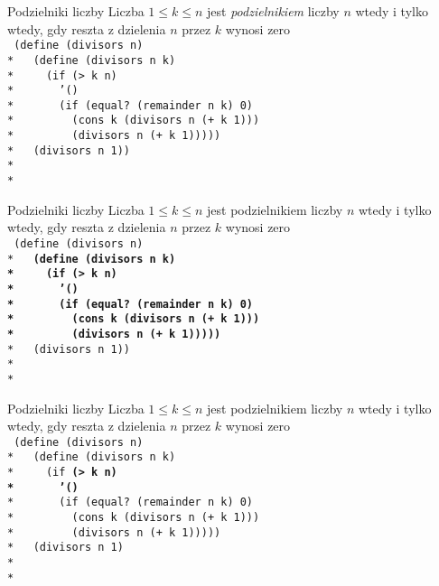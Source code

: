 \begin{frame}{Podzielniki liczby}
  Liczba $1 \le k \le n$ jest \emph{podzielnikiem} liczby $n$ wtedy i tylko wtedy,
  gdy reszta z dzielenia $n$ przez $k$ wynosi zero\\
  \texttt{
(define (divisors n)\\*
\ \ (define (divisors n k)\\*
\ \ \ \ (if (> k n)\\*
\ \ \ \ \ \ '()\\*
\ \ \ \ \ \ (if (equal?\ (remainder n k) 0)\\*
\ \ \ \ \ \ \ \ (cons k (divisors n (+ k 1)))\\*
\ \ \ \ \ \ \ \ (divisors n (+ k 1)))))\\*
\ \ (divisors n 1))
\ \\*
\ \\*
  }
\end{frame}

\begin{frame}{Podzielniki liczby}
  Liczba $1 \le k \le n$ jest podzielnikiem liczby $n$ wtedy i tylko wtedy,
  gdy reszta z dzielenia $n$ przez $k$ wynosi zero\\
  \texttt{
(define (divisors n)\\*
\ \ \textbf{(define (divisors n k)\\*
\ \ \ \ (if (> k n)\\*
\ \ \ \ \ \ '()\\*
\ \ \ \ \ \ (if (equal?\ (remainder n k) 0)\\*
\ \ \ \ \ \ \ \ (cons k (divisors n (+ k 1)))\\*
\ \ \ \ \ \ \ \ (divisors n (+ k 1)))))}\\*
\ \ (divisors n 1))
\ \\*
\ \\*
  }
\end{frame}

\begin{frame}{Podzielniki liczby}
  Liczba $1 \le k \le n$ jest podzielnikiem liczby $n$ wtedy i tylko wtedy,
  gdy reszta z dzielenia $n$ przez $k$ wynosi zero\\
  \texttt{
(define (divisors n)\\*
\ \ (define (divisors n k)\\*
\ \ \ \ (if \textbf{(> k n)\\*
\ \ \ \ \ \ '()}\\*
\ \ \ \ \ \ (if (equal?\ (remainder n k) 0)\\*
\ \ \ \ \ \ \ \ (cons k (divisors n (+ k 1)))\\*
\ \ \ \ \ \ \ \ (divisors n (+ k 1)))))\\*
\ \ (divisors n 1)
\ \\*
\ \\*
  }
\end{frame}

